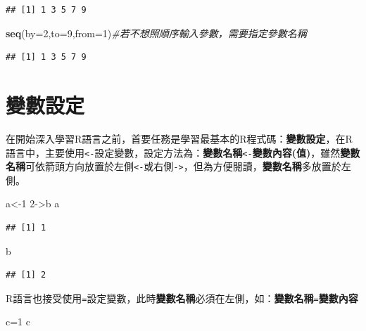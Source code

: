 \documentclass[]{book}
\newenvironment{Shaded}{\begin{snugshade}}{\end{snugshade}}
\newcommand{\KeywordTok}[1]{\textcolor[rgb]{0.13,0.29,0.53}{\textbf{{#1}}}}
\newcommand{\DataTypeTok}[1]{\textcolor[rgb]{0.13,0.29,0.53}{{#1}}}
\newcommand{\DecValTok}[1]{\textcolor[rgb]{0.00,0.00,0.81}{{#1}}}
\newcommand{\CommentTok}[1]{\textcolor[rgb]{0.56,0.35,0.01}{\textit{{#1}}}}
\newcommand{\NormalTok}[1]{{#1}}
\theoremstyle{definition}
\theoremstyle{definition}
\theoremstyle{remark}
\begin{document}
\begin{verbatim}
## [1] 1 3 5 7 9
\end{verbatim}

\begin{Shaded}
\begin{Highlighting}[]
\KeywordTok{seq}\NormalTok{(}\DataTypeTok{by=}\DecValTok{2}\NormalTok{,}\DataTypeTok{to=}\DecValTok{9}\NormalTok{,}\DataTypeTok{from=}\DecValTok{1}\NormalTok{)}\CommentTok{#若不想照順序輸入參數，需要指定參數名稱}
\end{Highlighting}
\end{Shaded}

\begin{verbatim}
## [1] 1 3 5 7 9
\end{verbatim}

\section{變數設定}

在開始深入學習R語言之前，首要任務是學習最基本的R程式碼：\textbf{變數設定}，在R語言中，主要使用\texttt{\textless{}-}設定變數，設定方法為：\textbf{變數名稱}\texttt{\textless{}-}\textbf{變數內容(值)}，雖然\textbf{變數名稱}可依箭頭方向放置於左側\texttt{\textless{}-}或右側\texttt{-\textgreater{}}，但為方便閱讀，\textbf{變數名稱}多放置於左側。

\begin{Shaded}
\begin{Highlighting}[]
\NormalTok{a<-}\DecValTok{1} 
\DecValTok{2}\NormalTok{->b}
\NormalTok{a}
\end{Highlighting}
\end{Shaded}

\begin{verbatim}
## [1] 1
\end{verbatim}

\begin{Shaded}
\begin{Highlighting}[]
\NormalTok{b}
\end{Highlighting}
\end{Shaded}

\begin{verbatim}
## [1] 2
\end{verbatim}

R語言也接受使用\texttt{=}設定變數，此時\textbf{變數名稱}必須在左側，如：\textbf{變數名稱}\texttt{=}\textbf{變數內容}

\begin{Shaded}
\begin{Highlighting}[]
\NormalTok{c=}\DecValTok{1} 
\NormalTok{c}
\end{Highlighting}
\end{Shaded}
\end{document}
